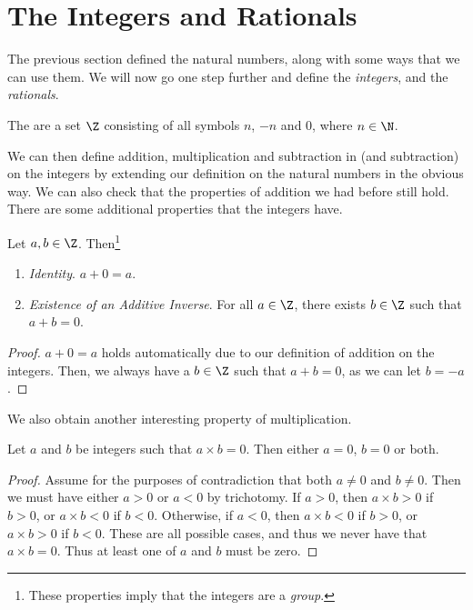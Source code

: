 \documentclass[a4paper]{scrreprt}
\begin{document}
\section{The Integers and Rationals}

The previous section defined the natural numbers, along with some ways that we can use them. We will now go one step further and define the \emph{integers}, and the \emph{rationals}.

\begin{definition}[Integers]
	The  are a set $\Z$ consisting of all symbols $n$, $-n$ and 0, where $n \in \N$. 
\end{definition}

We can then define addition, multiplication and subtraction in (and subtraction) on the integers by extending our definition on the natural numbers in the obvious way. We can also check that the properties of addition we had before still hold. There are some additional properties that the integers have.

\begin{proposition}
	Let $a, b \in \Z$. Then\footnote{These properties imply that the integers are a \emph{group}.}
	\begin{enumerate}[label=(\roman*)]
		\item \emph{Identity}. $a + 0 = a$.
		\item \emph{Existence of an Additive Inverse}. For all $a \in \Z$, there exists $b \in \Z$ such that $a + b = 0$.
	\end{enumerate}
\end{proposition}
\begin{proof}
	$a + 0 = a$ holds automatically due to our definition of addition on the integers. Then, we always have a $b \in \Z$ such that $a + b = 0$, as we can let $b = -a$.
\end{proof}

We also obtain another interesting property of multiplication.

\begin{proposition}
	Let $a$ and $b$ be integers such that $a \times b = 0$. Then either $a = 0$, $b = 0$ or both.
\end{proposition}
\begin{proof}
	Assume for the purposes of contradiction that both $a \neq 0$ and $b \neq 0$. Then we must have either $a > 0$ or $a < 0$ by trichotomy. If $a > 0$, then $a \times b > 0$ if $b > 0$, or $a \times b < 0$ if $b < 0$. Otherwise, if $a < 0$, then $a \times b < 0$ if $b > 0$, or $a \times b > 0$ if $b < 0$. These are all possible cases, and thus we never have that $a \times b = 0$. Thus at least one of $a$ and $b$ must be zero. 
\end{proof}
\end{document}
